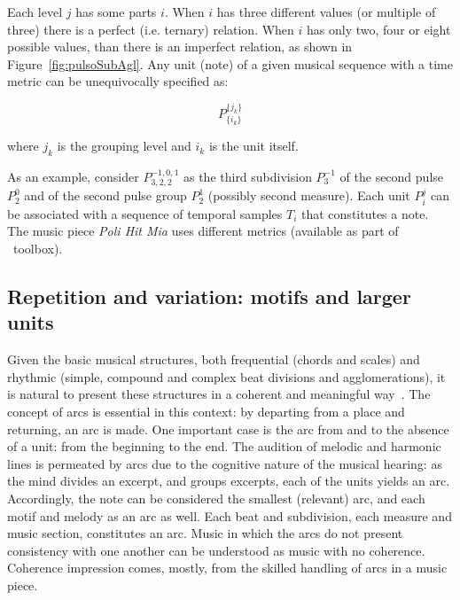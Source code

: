 Each level $j$ has some parts $i$. When $i$ has three different
values (or multiple of three) there is a perfect (i.e. ternary) relation. When $i$ has only
two, four or eight possible values, than there is an imperfect relation,
as shown in Figure~\ref{fig:pulsoSubAgl}. Any unit (note) of a given musical sequence with a time metric can be unequivocally
specified as:

\begin{equation}\label{eq:rhythmicUnit}
P^{ \{ j_k \} }_{ \{ i_{k} \}}
\end{equation}

\noindent where $j_k$ is the grouping level and $i_k$ is the unit itself.

As an example, consider $P^{-1,0,1}_{3,2,2}$ as the third subdivision $P^{-1}_3$ of the
second pulse $P^0_2$ and of the second pulse group $P^1_2$ (possibly second measure). Each unit $P_i^j$ can be associated with a sequence of temporal samples $T_i$ that constitutes a
note. The music piece \emph{Poli Hit Mia} uses different metrics (available as part of \massa\ toolbox).

\subsection{Repetition and variation: motifs and larger units}\label{subsec:motivos}
Given the basic musical structures, both frequential (chords and scales) and rhythmic (simple, compound and complex beat divisions and agglomerations), it is
natural to present these structures in a coherent and meaningful way~\cite{Boulez}. The concept of arcs is essential in this context: by departing from a place and returning, an arc is made. One important case is the arc from and to the absence of a unit: from the beginning to the end. The audition of melodic and harmonic lines is permeated by
arcs due to the cognitive nature of the musical hearing: as the mind divides an excerpt, and groups excerpts, each of the units yields an arc.
Accordingly, the note can be considered the smallest (relevant) arc, and each motif and melody as an arc as well.
Each beat and subdivision, each measure and music
section, constitutes an arc. Music in which the arcs do not present consistency with one another can be understood as music with no coherence. Coherence impression
comes, mostly, from the skilled handling of arcs in a music piece.

